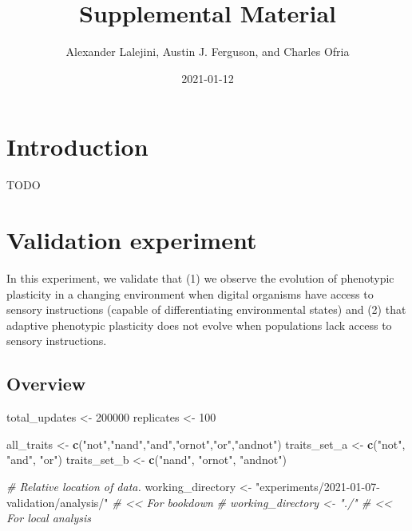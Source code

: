 \documentclass[]{book}
\title{Supplemental Material}
\author{Alexander Lalejini, Austin J. Ferguson, and Charles Ofria}
\date{2021-01-12}
\newenvironment{Shaded}{\begin{snugshade}}{\end{snugshade}}
\newcommand{\CommentTok}[1]{\textcolor[rgb]{0.56,0.35,0.01}{\textit{#1}}}
\newcommand{\DecValTok}[1]{\textcolor[rgb]{0.00,0.00,0.81}{#1}}
\newcommand{\KeywordTok}[1]{\textcolor[rgb]{0.13,0.29,0.53}{\textbf{#1}}}
\newcommand{\NormalTok}[1]{#1}
\newcommand{\StringTok}[1]{\textcolor[rgb]{0.31,0.60,0.02}{#1}}
\begin{document}
\maketitle

{
\setcounter{tocdepth}{1}
\tableofcontents
}
\hypertarget{introduction}{%
\chapter{Introduction}\label{introduction}}

TODO

\hypertarget{validation-experiment}{%
\chapter{Validation experiment}\label{validation-experiment}}

In this experiment, we validate that
(1) we observe the evolution of phenotypic plasticity in a changing environment when digital organisms have access to sensory instructions (capable of differentiating environmental states)
and (2) that adaptive phenotypic plasticity does not evolve when populations lack access to sensory instructions.

\hypertarget{overview}{%
\section{Overview}\label{overview}}

\begin{Shaded}
\begin{Highlighting}[]
\NormalTok{total_updates <-}\StringTok{ }\DecValTok{200000}
\NormalTok{replicates <-}\StringTok{ }\DecValTok{100}

\NormalTok{all_traits <-}\StringTok{ }\KeywordTok{c}\NormalTok{(}\StringTok{"not"}\NormalTok{,}\StringTok{"nand"}\NormalTok{,}\StringTok{"and"}\NormalTok{,}\StringTok{"ornot"}\NormalTok{,}\StringTok{"or"}\NormalTok{,}\StringTok{"andnot"}\NormalTok{)}
\NormalTok{traits_set_a <-}\StringTok{ }\KeywordTok{c}\NormalTok{(}\StringTok{"not"}\NormalTok{, }\StringTok{"and"}\NormalTok{, }\StringTok{"or"}\NormalTok{)}
\NormalTok{traits_set_b <-}\StringTok{ }\KeywordTok{c}\NormalTok{(}\StringTok{"nand"}\NormalTok{, }\StringTok{"ornot"}\NormalTok{, }\StringTok{"andnot"}\NormalTok{)}

\CommentTok{# Relative location of data.}
\NormalTok{working_directory <-}\StringTok{ "experiments/2021-01-07-validation/analysis/"} \CommentTok{# << For bookdown}
\CommentTok{# working_directory <- "./"                                              # << For local analysis}
\end{Highlighting}
\end{Shaded}
\end{document}
